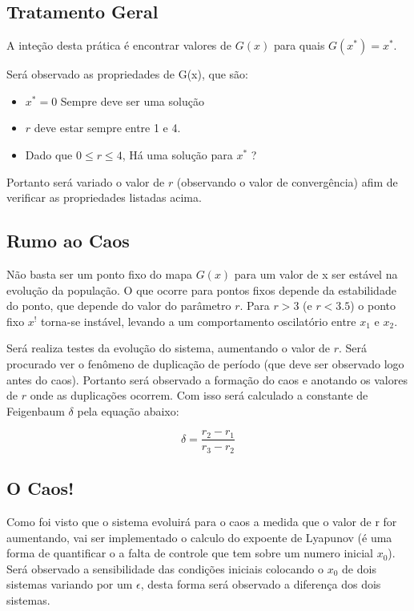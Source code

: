 \documentclass[a4paper, 12pt]{article}
\begin{document}
\subsection{Tratamento Geral}

A inteção desta prática é encontrar valores de $G(x)$ para quais $G(x^*) = x^*$.

Será observado as propriedades de G(x), que são:

\begin{itemize}
	\item $x^* = 0$ Sempre deve ser uma solução \label{item:i}
	\item $r$ deve estar sempre entre 1 e 4. \label{item:ii}
	\item Dado que  $ 0 \leq r \leq 4 $, Há uma solução para  $x^*$ ? \label{item:iii}
\end{itemize}

Portanto será variado o valor de $r$ (observando o valor de convergência) afim de verificar as propriedades listadas acima.

\subsection{Rumo ao Caos}


Não basta ser um ponto fixo do mapa $G(x)$ para um valor de x ser estável na evolução da população.
O que ocorre para pontos fixos depende da estabilidade do ponto, que depende do valor do parâmetro $r$. Para $r > 3$ (e $r < 3.5$) o ponto fixo $x^{!}$ torna-se instável, levando a um comportamento oscilatório entre $x_1$ e $x_2$. 

Será realiza testes da evolução do sistema, aumentando o valor de $r$. Será procurado ver o fenômeno de duplicação de período (que deve ser  observado logo antes do caos). Portanto será observado a formação do caos e anotando os valores de $r$ onde as duplicações ocorrem. Com isso será calculado a constante de Feigenbaum $\delta$ pela equação abaixo:

\begin{equation}
	\delta = \frac{r_2 - r_1}{r_3 - r_2}
	\label{eq:deltaDelta}	
\end{equation}

\subsection{O Caos!}


Como foi visto que o sistema evoluirá para o caos a medida que o valor de r for aumentando, vai ser
implementado o calculo do expoente de Lyapunov (é uma forma de quantificar o a falta de controle que tem
sobre um numero inicial $x_0$). Será observado a sensibilidade das condições iniciais colocando o
$x_0$ de dois sistemas variando por um $\epsilon$, desta forma será observado a diferença dos dois sistemas.
\end{document}
